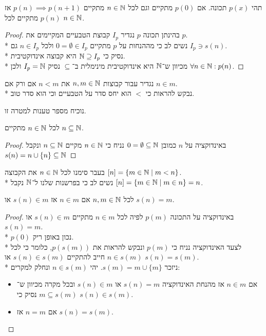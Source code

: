 \begin{theorem}
	תהי $p(x)$ תכונה. אם $p(0)$ מתקיים וגם לכל $n \in \mathbb{N}$ מתקיים $p(n) \implies p(n + 1)$ אז $p(n)$ מתקיים לכל $n \in \mathbb{N}$.
\end{theorem}
\begin{proof}
	בהינתן תכונה $p$ נגדיר $I_p$ קבוצת הטבעיים המקיימים את $p$. \\*
	נשים לב כי מההנחות על $p$ מתקיים $0 = \emptyset \in I_p$ ולכל $n \in I_p$ גם $I_p \ni s(n)$. \\*
	נסיק כי $\mathbb{N} \supseteq I_p$ היא קבוצה אינדוקטיבית. \\*
	מכיוון ש־$\mathbb{N}$ היא אינדוקטיבית מינימלית ב־$\subseteq$ נסיק $I_p = \mathbb{N}$ ולכן $\forall n \in \mathbb{N} : p(n)$.
\end{proof}
\begin{definition}
	נגדיר עבור קבוצות $n, m \in \mathbb{N}$ את $n < m$ אם ורק אם $n \in m$. \\*
	נבקש להראות כי $<$ הוא יחס סדר על הטבעיים וכי הוא סדר טוב.
\end{definition}
נוכיח מספר טענות למטרה זו.
\begin{proposition}
	לכל $n \in \mathbb{N}$ מתקיים $n \subseteq \mathbb{N}$.
\end{proposition}
\begin{proof}
	באינדוקציה על $n$ כמובן $0 = \emptyset \subseteq \mathbb{N}$
	נניח כי $n \in \mathbb{N}$ מקיים $n \subseteq \mathbb{N}$ ונקבל $s(n) = n \cup \{ n \} \subseteq \mathbb{N}$
\end{proof}
\begin{remark}
	בעבר סימנו לכל $n \in \mathbb{N}$ את הקבוצה $[n] = \{ m \in \mathbb{N} \mid m < n \}$. \\*
	נשים לב כי בפרשנות שלנו ל־$\mathbb{N}$ נקבל $[n] = \{ m \in \mathbb{N} \mid m \in n \} = n$.
\end{remark}
\begin{proposition}
	לכל $n, m \in \mathbb{N}$ אם $n \in m$ אז $s(n) \in m$ או $s(n) = m$.
\end{proposition}
\begin{proof}
	באינדוקציה על התכונה $p(m)$ לפיה לכל $n \in m$ מתקיים $s(n) \in m$ או $s(n) = m$. \\*
	$p(0)$ נכון באופן ריק. \\*
	לצעד האינדוקציה נניח כי $p(m)$ ונבקש להראות את $p(s(m))$, כלומר כי לכל $n \in s(m)$ חייב להתקיים $s(n) \in s(m)$ או $s(n) = s(m)$. \\*
	ניזכר $s(m) = m \cup \{ m \}$.
	יהי $n \in s(m)$ ונחלק למקרים:
	\begin{itemize}
		\item אם $n \in m$ אז מהנחת האינדוקציה $s(n) = m$ או $s(n) \in m$ ובכל מקרה מכיוון ש־$m \subseteq s(m)$ נסיק כי $s(n) \in s(m)$.
		\item אם $n = m$ אז $s(n) = s(m)$.
	\end{itemize}
\end{proof}
